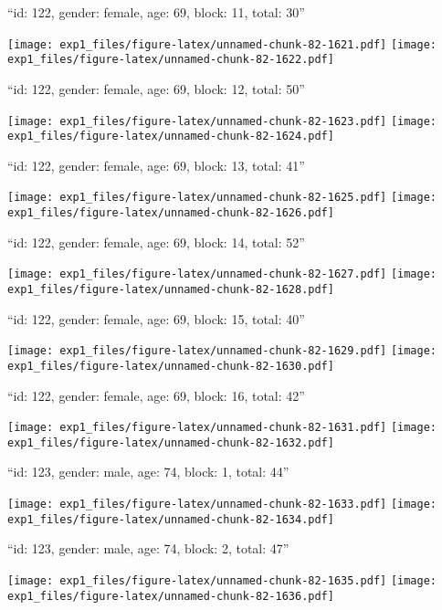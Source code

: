 \documentclass[11pt,,]{article}
\begin{document}
\newpage
[1] 

``id: 122, gender: female, age: 69, block: 11, total: 30''

\texttt{[image: exp1\_files/figure-latex/unnamed-chunk-82-1621.pdf]}
\texttt{[image: exp1\_files/figure-latex/unnamed-chunk-82-1622.pdf]}

\newpage
[1] 

``id: 122, gender: female, age: 69, block: 12, total: 50''

\texttt{[image: exp1\_files/figure-latex/unnamed-chunk-82-1623.pdf]}
\texttt{[image: exp1\_files/figure-latex/unnamed-chunk-82-1624.pdf]}

\newpage
[1] 

``id: 122, gender: female, age: 69, block: 13, total: 41''

\texttt{[image: exp1\_files/figure-latex/unnamed-chunk-82-1625.pdf]}
\texttt{[image: exp1\_files/figure-latex/unnamed-chunk-82-1626.pdf]}

\newpage
[1] 

``id: 122, gender: female, age: 69, block: 14, total: 52''

\texttt{[image: exp1\_files/figure-latex/unnamed-chunk-82-1627.pdf]}
\texttt{[image: exp1\_files/figure-latex/unnamed-chunk-82-1628.pdf]}

\newpage
[1] 

``id: 122, gender: female, age: 69, block: 15, total: 40''

\texttt{[image: exp1\_files/figure-latex/unnamed-chunk-82-1629.pdf]}
\texttt{[image: exp1\_files/figure-latex/unnamed-chunk-82-1630.pdf]}

\newpage
[1] 

``id: 122, gender: female, age: 69, block: 16, total: 42''

\texttt{[image: exp1\_files/figure-latex/unnamed-chunk-82-1631.pdf]}
\texttt{[image: exp1\_files/figure-latex/unnamed-chunk-82-1632.pdf]}

\newpage
[1] 

``id: 123, gender: male, age: 74, block: 1, total: 44''

\texttt{[image: exp1\_files/figure-latex/unnamed-chunk-82-1633.pdf]}
\texttt{[image: exp1\_files/figure-latex/unnamed-chunk-82-1634.pdf]}

\newpage
[1] 

``id: 123, gender: male, age: 74, block: 2, total: 47''

\texttt{[image: exp1\_files/figure-latex/unnamed-chunk-82-1635.pdf]}
\texttt{[image: exp1\_files/figure-latex/unnamed-chunk-82-1636.pdf]}
\end{document}
